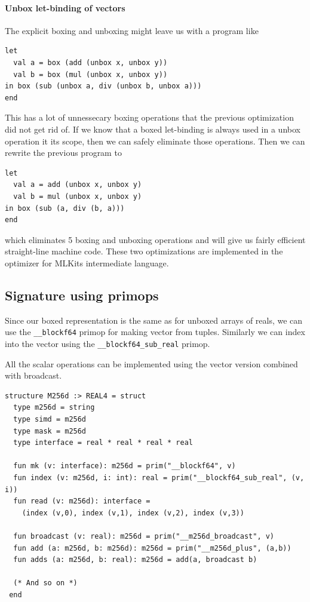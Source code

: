 \documentclass{article}
\begin{document}
\paragraph{Unbox let-binding of vectors}
The explicit boxing and unboxing might leave us with a program like
\begin{lstlisting}
let
  val a = box (add (unbox x, unbox y))
  val b = box (mul (unbox x, unbox y))
in box (sub (unbox a, div (unbox b, unbox a)))
end
\end{lstlisting}
This has a lot of unnessecary boxing operations that the previous optimization did not get rid of. If we know that a boxed let-binding is always used in a unbox operation it its scope, then we can safely eliminate those operations. Then we can rewrite the previous program to
\begin{lstlisting}
let
  val a = add (unbox x, unbox y)
  val b = mul (unbox x, unbox y)
in box (sub (a, div (b, a)))
end
\end{lstlisting}
which eliminates 5 boxing and unboxing operations and will give us fairly efficient straight-line machine code. These two optimizations are implemented in the optimizer for MLKits intermediate language.

\subsection{Signature using primops}

Since our boxed representation is the same as for unboxed arrays of reals, we can use the \verb!__blockf64! primop for making vector from tuples. Similarly we can index into the vector using the \verb!__blockf64_sub_real! primop.

All the scalar operations can be implemented using the vector version combined with broadcast.
\begin{lstlisting}[frame=single]
structure M256d :> REAL4 = struct
  type m256d = string
  type simd = m256d
  type mask = m256d
  type interface = real * real * real * real

  fun mk (v: interface): m256d = prim("__blockf64", v)
  fun index (v: m256d, i: int): real = prim("__blockf64_sub_real", (v, i))
  fun read (v: m256d): interface =
    (index (v,0), index (v,1), index (v,2), index (v,3))

  fun broadcast (v: real): m256d = prim("__m256d_broadcast", v)
  fun add (a: m256d, b: m256d): m256d = prim("__m256d_plus", (a,b))
  fun adds (a: m256d, b: real): m256d = add(a, broadcast b)

  (* And so on *)
 end
\end{lstlisting}
\end{document}
